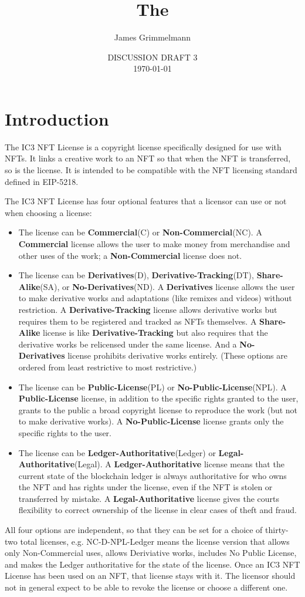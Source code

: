 \documentclass{article}
\title{The \iccclicense\\}
\author{James Grimmelmann}
\affil{Cornell Tech and Cornell Law School\\Institute for Cryptocurrencies and Contracts}
\date{DISCUSSION DRAFT 3\\\today}
\newcommand{\eiplicense}{EIP-5218\xspace}
\newcommand{\iccclicense}{IC3 NFT License\xspace}
\newcommand{\keyword}[1]{\textbf{#1}\xspace}
\newcommand{\publiclicense}{\keyword{Public-License}}
\newcommand{\nopubliclicense}{\keyword{No-Public-License}}
\newcommand{\commercial}{\keyword{Commercial}}
\newcommand{\noncommercial}{\keyword{Non-Commercial}}
\newcommand{\noderivative}{\keyword{No-Derivatives}}
\newcommand{\derivative}{\keyword{Derivatives}}
\newcommand{\sharealike}{\keyword{Share-Alike}}
\newcommand{\derivativetracking}{\keyword{Derivative-Tracking}}
\newcommand{\ledger}{\keyword{Ledger-Authoritative}}
\newcommand{\legal}{\keyword{Legal-Authoritative}}
\begin{document}
\maketitle

\tableofcontents

\section{Introduction}

The \iccclicense is a copyright license specifically designed for use with NFTs. It links a creative work to an NFT so that when the NFT is transferred, so is the license. It is intended to be compatible with the NFT licensing standard defined in \eiplicense. 

The \iccclicense has four optional features that a licensor can use or not when choosing a license:
\begin{itemize}
\item The license can be \commercial (C) or \noncommercial (NC). A \commercial license allows the user to make money from merchandise and other uses of the work; a \noncommercial license does not.
\item The license can be \derivative (D), \derivativetracking (DT), \sharealike (SA), or \noderivative (ND). A \derivative license allows the user to make derivative works and adaptations (like remixes and videos) without restriction. A \derivativetracking license allows derivative works but requires them to be registered and tracked as NFTs themselves. A \sharealike license is like \derivativetracking but also requires that the derivative works be relicensed under the same license. And a \noderivative license prohibits derivative works entirely. (These options are ordered from least restrictive to most restrictive.)
\item The license can be \publiclicense (PL) or \nopubliclicense (NPL). A \publiclicense license, in addition to the specific rights granted to the user, grants to the public a broad copyright license to reproduce the work (but not to make derivative works). A \nopubliclicense license grants only the specific rights to the user.
\item The license can be \ledger (Ledger) or \legal (Legal). A \ledger license means that the current state of the blockchain ledger is always authoritative for who owns the NFT and has rights under the license, even if the NFT is stolen or transferred by mistake. A \legal license gives the courts flexibility to correct ownership of the license in clear cases of theft and fraud.
\end{itemize}
All four options are independent, so that they can be set for a choice of thirty-two total licenses, e.g. NC-D-NPL-Ledger means the license version that allows only Non-Commercial uses, allows Deriviative works, includes No Public License, and makes the Ledger authoritative for the state of the license. Once an \iccclicense has been used on an NFT, that license stays with it. The licensor should not in general expect to be able to revoke the license or choose a different one.
\end{document}
